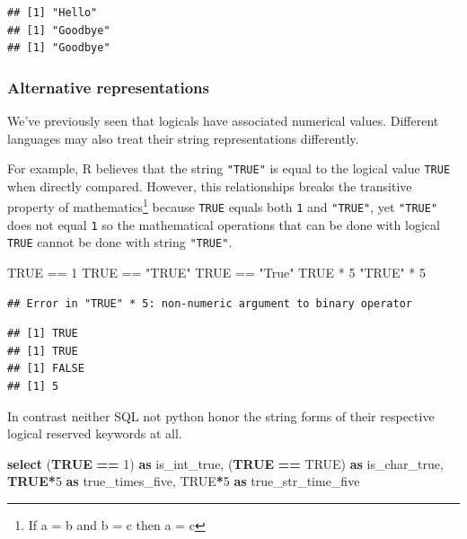\documentclass[
]{krantz}
\makeatletter
\newenvironment{Shaded}{\begin{snugshade}}{\end{snugshade}}
\newcommand{\ConstantTok}[1]{\textcolor[rgb]{0,0,0}{#1}}
\newcommand{\DecValTok}[1]{\textcolor[rgb]{0.06,0.06,0.06}{#1}}
\newcommand{\KeywordTok}[1]{\textcolor[rgb]{0.27,0.27,0.27}{\textbf{#1}}}
\newcommand{\NormalTok}[1]{#1}
\newcommand{\OperatorTok}[1]{\textcolor[rgb]{0.43,0.43,0.43}{\textbf{#1}}}
\newcommand{\SpecialCharTok}[1]{\textcolor[rgb]{0,0,0}{#1}}
\newcommand{\StringTok}[1]{\textcolor[rgb]{0.5,0.5,0.5}{#1}}
\newenvironment{kframe}{%
\medskip{}
\setlength{\fboxsep}{.8em}
 \def\at@end@of@kframe{}%
 \ifinner\ifhmode%
  \def\at@end@of@kframe{\end{minipage}}%
  \begin{minipage}{\columnwidth}%
 \fi\fi%
 \def\FrameCommand##1{\hskip\@totalleftmargin \hskip-\fboxsep
 \colorbox{shadecolor}{##1}\hskip-\fboxsep
     \hskip-\linewidth \hskip-\@totalleftmargin \hskip\columnwidth}%
 \MakeFramed {\advance\hsize-\width
   \@totalleftmargin\z@ \linewidth\hsize
   \@setminipage}}%
 {\par\unskip\endMakeFramed%
 \at@end@of@kframe}
\renewenvironment{Shaded}{\begin{kframe}}{\end{kframe}}
\makeatother
\begin{document}
\begin{verbatim}
## [1] "Hello"
## [1] "Goodbye"
## [1] "Goodbye"
\end{verbatim}

\hypertarget{alternative-representations}{%
\subsubsection{Alternative representations}\label{alternative-representations}}

We've previously seen that logicals have associated numerical values.
Different languages may also treat their string representations differently.

For example, R believes that the string \texttt{"TRUE"} is equal to the logical value \texttt{TRUE} when directly compared.
However, this relationships breaks the transitive property of mathematics\footnote{If a = b and b = c then a = c} because \texttt{TRUE} equals both \texttt{1} and \texttt{"TRUE"}, yet \texttt{"TRUE"} does not equal \texttt{1} so the mathematical operations that can be done with logical \texttt{TRUE} cannot be done with string \texttt{"TRUE"}.

\begin{Shaded}
\begin{Highlighting}[]
\ConstantTok{TRUE} \SpecialCharTok{==} \DecValTok{1}
\ConstantTok{TRUE} \SpecialCharTok{==} \StringTok{"TRUE"}
\ConstantTok{TRUE} \SpecialCharTok{==} \StringTok{"True"}
\ConstantTok{TRUE} \SpecialCharTok{*} \DecValTok{5}
\StringTok{"TRUE"} \SpecialCharTok{*} \DecValTok{5}
\end{Highlighting}
\end{Shaded}

\begin{verbatim}
## Error in "TRUE" * 5: non-numeric argument to binary operator
\end{verbatim}

\begin{verbatim}
## [1] TRUE
## [1] TRUE
## [1] FALSE
## [1] 5
\end{verbatim}

In contrast neither SQL not python honor the string forms of their respective logical reserved keywords at all.

\begin{Shaded}
\begin{Highlighting}[]
\KeywordTok{select} 
\NormalTok{  (}\KeywordTok{TRUE} \OperatorTok{==} \DecValTok{1}\NormalTok{) }\KeywordTok{as}\NormalTok{ is\_int\_true,}
\NormalTok{  (}\KeywordTok{TRUE} \OperatorTok{==} \StringTok{\textquotesingle{}TRUE\textquotesingle{}}\NormalTok{) }\KeywordTok{as}\NormalTok{ is\_char\_true,}
  \KeywordTok{TRUE}\OperatorTok{*}\DecValTok{5} \KeywordTok{as}\NormalTok{ true\_times\_five,}
  \StringTok{\textquotesingle{}TRUE\textquotesingle{}}\OperatorTok{*}\DecValTok{5} \KeywordTok{as}\NormalTok{ true\_str\_time\_five}
\end{Highlighting}
\end{Shaded}
\end{document}
